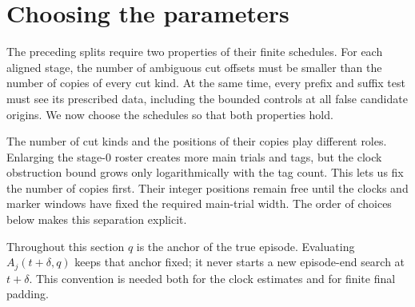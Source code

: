 \section{Choosing the parameters}\label{sec:parameters}

The preceding splits require two properties of their finite schedules.
For each aligned stage, the number of ambiguous cut offsets must be
smaller than the number of copies of every cut kind. At the same time,
every prefix and suffix test must see its prescribed data, including
the bounded controls at all false candidate origins. We now choose
the schedules so that both properties hold.

The number of cut kinds and the positions of their copies play different
roles. Enlarging the stage-0 roster creates more main trials and tags,
but the clock obstruction bound grows only logarithmically with the
tag count. This lets us fix the number of copies first. Their integer
positions remain free until the clocks and marker windows have fixed
the required main-trial width. The order of choices below makes this
separation explicit.

Throughout this section \(q\) is the anchor of the true episode.
Evaluating \(A_j(t+\delta,q)\) keeps that anchor fixed; it never
starts a new episode-end search at \(t+\delta\). This convention is
needed both for the clock estimates and for finite final padding.

